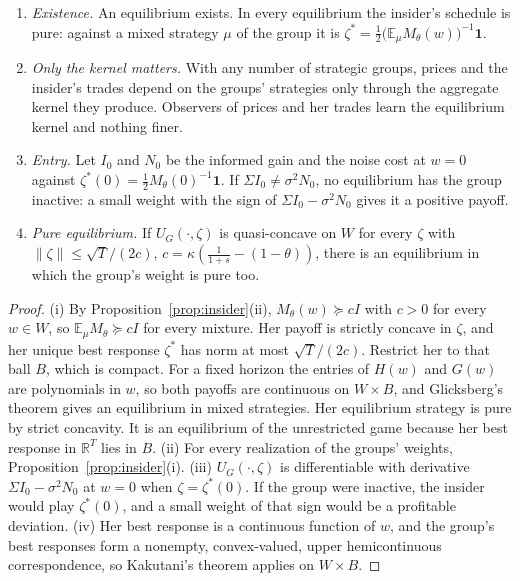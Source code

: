 \begin{proposition}\label{prop:insidergame}
\begin{enumerate}[label=(\roman*),itemsep=1pt]
\item \emph{Existence.} An equilibrium exists. In every equilibrium the insider's schedule is pure: against a mixed strategy $\mu$ of the group it is $\zeta^*=\frac12\bigl(\mathbb E_\mu M_\theta(w)\bigr)^{-1}\mathbf 1$.
\item \emph{Only the kernel matters.} With any number of strategic groups, prices and the insider's trades depend on the groups' strategies only through the aggregate kernel they produce. Observers of prices and her trades learn the equilibrium kernel and nothing finer.
\item \emph{Entry.} Let $I_0$ and $N_0$ be the informed gain and the noise cost at $w=0$ against $\zeta^*(0)=\frac12M_\theta(0)^{-1}\mathbf 1$. If $\Sigma I_0\ne\sigma^2N_0$, no equilibrium has the group inactive: a small weight with the sign of $\Sigma I_0-\sigma^2N_0$ gives it a positive payoff.
\item \emph{Pure equilibrium.} If $U_G(\cdot,\zeta)$ is quasi-concave on $W$ for every $\zeta$ with $\|\zeta\|\le\sqrt T/(2c)$, $c=\kappa(\frac1{1+s}-(1-\theta))$, there is an equilibrium in which the group's weight is pure too.
\end{enumerate}
\end{proposition}

\begin{proof}
(i) By Proposition~\ref{prop:insider}(ii), $M_\theta(w)\succeq cI$ with $c>0$ for every $w\in W$, so $\mathbb E_\mu M_\theta\succeq cI$ for every mixture. Her payoff is strictly concave in $\zeta$, and her unique best response $\zeta^*$ has norm at most $\sqrt T/(2c)$. Restrict her to that ball $B$, which is compact. For a fixed horizon the entries of $H(w)$ and $G(w)$ are polynomials in $w$, so both payoffs are continuous on $W\times B$, and Glicksberg's theorem \citep{glicksberg1952} gives an equilibrium in mixed strategies. Her equilibrium strategy is pure by strict concavity. It is an equilibrium of the unrestricted game because her best response in $\mathbb R^T$ lies in $B$. (ii) For every realization of the groups' weights, Proposition~\ref{prop:insider}(i). (iii) $U_G(\cdot,\zeta)$ is differentiable with derivative $\Sigma I_0-\sigma^2N_0$ at $w=0$ when $\zeta=\zeta^*(0)$. If the group were inactive, the insider would play $\zeta^*(0)$, and a small weight of that sign would be a profitable deviation. (iv) Her best response is a continuous function of $w$, and the group's best responses form a nonempty, convex-valued, upper hemicontinuous correspondence, so Kakutani's theorem applies on $W\times B$.
\end{proof}

